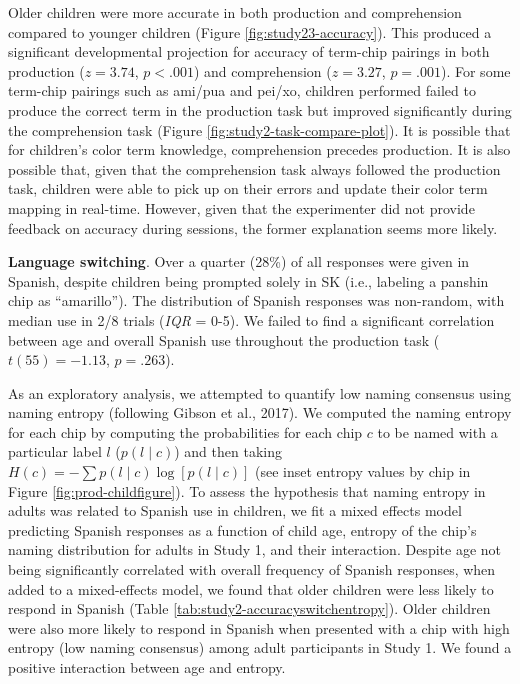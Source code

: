 \documentclass[
  english,
  ,man,floatsintext]{apa6}
\begin{document}
Older children were more accurate in both production and comprehension compared to younger children (Figure \ref{fig:study23-accuracy}). This produced a significant developmental projection for accuracy of term-chip pairings in both production (\(z = 3.74\), \(p < .001\)) and comprehension (\(z = 3.27\), \(p = .001\)). For some term-chip pairings such as ami/pua and pei/xo, children performed failed to produce the correct term in the production task but improved significantly during the comprehension task (Figure \ref{fig:study2-task-compare-plot}). It is possible that for children's color term knowledge, comprehension precedes production. It is also possible that, given that the comprehension task always followed the production task, children were able to pick up on their errors and update their color term mapping in real-time. However, given that the experimenter did not provide feedback on accuracy during sessions, the former explanation seems more likely.

\textbf{Language switching}. Over a quarter (28\%) of all responses were given in Spanish, despite children being prompted solely in SK (i.e., labeling a panshin chip as \enquote{amarillo}). The distribution of Spanish responses was non-random, with median use in 2/8 trials (\emph{IQR} = 0-5). We failed to find a significant correlation between age and overall Spanish use throughout the production task (\(t(55) = -1.13\), \(p = .263\)).

As an exploratory analysis, we attempted to quantify low naming consensus using naming entropy (following Gibson et al., 2017). We computed the naming entropy for each chip by computing the probabilities for each chip \(c\) to be named with a particular label \(l\) (\(p(l \mid c)\)) and then taking \(H(c) = - \sum{p(l\mid c) \log[p(l \mid c)]}\) (see inset entropy values by chip in Figure \ref{fig:prod-childfigure}).
To assess the hypothesis that naming entropy in adults was related to Spanish use in children, we fit a mixed effects model predicting Spanish responses as a function of child age, entropy of the chip's naming distribution for adults in Study 1, and their interaction. Despite age not being significantly correlated with overall frequency of Spanish responses, when added to a mixed-effects model, we found that older children were less likely to respond in Spanish (Table \ref{tab:study2-accuracyswitchentropy}). Older children were also more likely to respond in Spanish when presented with a chip with high entropy (low naming consensus) among adult participants in Study 1. We found a positive interaction between age and entropy.
\end{document}

